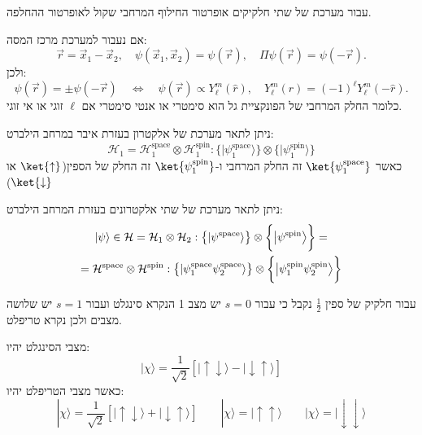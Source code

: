 \documentclass{tstextbook}
\begin{document}
\begin{proposition}
עבור מערכת של שתי חלקיקים אופרטור החילוף המרחבי שקול לאופרטור ההחלפה.

\end{proposition}
\begin{corollary}
אם נעבור למערכת מרכז המסה:
$$\vec{r}=\vec{x}_{1}-\vec{x}_{2},\quad\psi\left( \vec{x}_{1},\vec{x}_{2} \right)=\psi\left( \vec{r} \right),\quad\Pi\psi\left( \vec{r} \right)=\psi\left( -\vec{r} \right).$$
ולכן:
$$\psi(\vec{r})=\pm\psi(-\vec{r})\quad\Leftrightarrow\quad\psi(\vec{r})\propto Y_{\ell}^{m}(\hat{r}),\quad Y_{\ell}^{m}(\hat{r})=(-1)^{\ell}Y_{\ell}^{m}(-\hat{r}).$$
כלומר החלק המרחבי של הפונקציית גל הוא סימטרי או אנטי סימטרי אם \(\ell\) זוגי או אי זוגי.

\end{corollary}
\begin{proposition}
ניתן לתאר מערכת של אלקטרון בעזרת איבר במרחב הילברט:
$${\mathcal{H}}_{1}={\mathcal{H}}_{1}^{\mathrm{space}}\otimes{\mathcal{H}}_{1}^{\mathrm{spin}}:\big\{|\psi_{1}^{\mathrm{space}}\rangle\big\}\otimes\Big\{\Big|\psi_{1}^{\mathrm{spin}}\Big\rangle\Big\}$$
כאשר \(\ket{\psi_{1}^{\mathrm{space}}}\) זה החלק המרחבי ו-\(\ket{\psi_{1}^{\mathrm{spin}}}\) זה החלק של הספין(\(\ket{\uparrow}\) או \(\ket{\downarrow}\))

\end{proposition}
\begin{corollary}
ניתן לתאר מערכת של שתי אלקטרונים בעזרת המרחב הילברט:
\begin{gather*}|\psi\rangle\in\mathcal{H}=\mathcal{H}_{1}\otimes\mathcal{H}_{2}:\big{\{}|\psi^{\mathrm{space}}\rangle\big{\}}\otimes\bigg{\{}\big{|}\psi^{\mathrm{spin}}\big{\rangle}\bigg{\}}=\\=\mathcal{H}^{\mathrm{space}}\otimes\mathcal{H}^{\mathrm{spin}}:\big{\{}|\psi_{1}^{\mathrm{space}}\psi_{2}^{\mathrm{space}}\rangle\big{\}}\otimes\bigg{\{}\big{|}\psi_{1}^{\mathrm{spin}}\psi_{2}^{\mathrm{spin}}\big{\rangle}\bigg{\}} 
\end{gather*}

\end{corollary}
\begin{definition}
עבור חלקיק של ספין \(\frac{1}{2}\) נקבל כי עבור \(s=0\) יש מצב 1 הנקרא סינגלט ועבור \(s=1\) יש שלושה מצבים ולכן נקרא טריפלט.

\end{definition}
\begin{proposition}
מצבי הסינגלט יהיו:
$$|\chi\rangle=\frac{1}{\sqrt{2}}[|\uparrow\downarrow\rangle-|\downarrow\uparrow\rangle]$$
כאשר מצבי הטריפלט יהיו:
$$|\chi\rangle=\frac{1}{\sqrt{2}}\left[ |\uparrow\downarrow\rangle+|\downarrow\uparrow\rangle \right]\qquad |\chi\rangle=|\uparrow\uparrow\rangle\qquad |\chi\rangle=|\downarrow\downarrow\rangle$$

\end{proposition}
\end{document}
